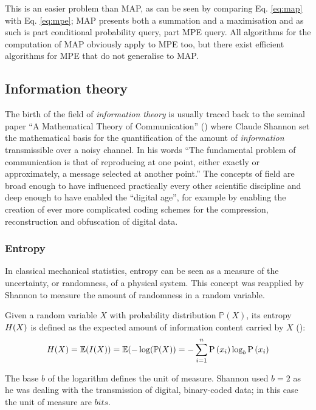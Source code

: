 This is an easier problem than MAP, as can be seen by comparing Eq. \ref{eq:map} with Eq. \ref{eq:mpe}; MAP presents both a summation and a maximisation and as such is part conditional probability query, part MPE query.
All algorithms for the computation of MAP obviously apply to MPE too, but there exist efficient algorithms for MPE that do not generalise to MAP.


\subsection{Information theory}
The birth of the field of \textit{information theory} is usually traced back to the seminal paper \enquote{A Mathematical Theory of Communication} (\cite{Shannon1949}) where Claude Shannon set the mathematical basis for the quantification of the amount of \textit{information} transmissible over a noisy channel. 
In his words \enquote{The fundamental problem of communication is that of reproducing at one point, either exactly or approximately, a message selected at another point.}
The concepts of field are broad enough to have influenced practically every other scientific discipline and deep enough to have enabled the \enquote{digital age}, for example by enabling the creation of ever more complicated coding schemes for the compression, reconstruction and obfuscation of digital data.

\subsubsection{Entropy}
In classical mechanical statistics, entropy can be seen as a measure of the uncertainty, or randomness, of a physical system.  
This concept was reapplied by Shannon to measure the amount of randomness in a random variable.
\begin{definition}
	Given a random variable $X$ with probability distribution $\mathbb{P}(X)$, its entropy $H(X)$ is defined as the expected amount of information content carried by $X$ (\cite{Schneider2005}):
\begin{equation} \label{eq:entropy}
	H(X) = \mathbb{E}(I(X)) = \mathbb{E}(-\log (\mathbb{P}(X)) = -\sum_{i=1}^{n} \mathrm{P}\left(x_{i}\right) \log _{b} \mathrm{P}\left(x_{i}\right)
\end{equation}
\end{definition}
The base $b$ of the logarithm defines the unit of measure.  Shannon used $b=2$ as he was dealing with the transmission of digital, binary-coded data; in this case the unit of measure are $bits$.

